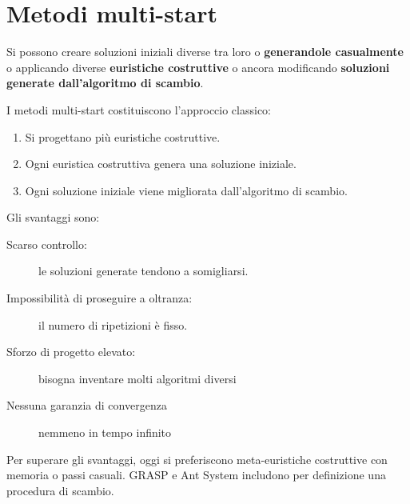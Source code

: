 \documentclass[\main/main.tex]{subfiles}
\begin{document}
\section{Metodi multi-start}
\begin{multicols}{2}
    \begin{observation}
        Si possono creare soluzioni iniziali diverse tra loro o \textbf{generandole casualmente} o applicando diverse \textbf{euristiche costruttive} o ancora modificando \textbf{soluzioni generate dall'algoritmo di scambio}.
    \end{observation}
    \begin{definition}
        I metodi multi-start costituiscono l'approccio classico:
        \begin{enumerate}
            \item Si progettano più euristiche costruttive.
            \item Ogni euristica costruttiva genera una soluzione iniziale.
            \item Ogni soluzione iniziale viene migliorata dall'algoritmo di scambio.
        \end{enumerate}
    \end{definition}
    \begin{observation}
        Gli svantaggi sono:
        \begin{description}
            \item[Scarso controllo:] le soluzioni generate tendono a somigliarsi.
            \item[Impossibilità di proseguire a oltranza:] il numero di ripetizioni è fisso.
            \item[Sforzo di progetto elevato:] bisogna inventare molti algoritmi diversi
            \item[Nessuna garanzia di convergenza] nemmeno in tempo infinito
        \end{description}
    \end{observation}
    \begin{observation}
        Per superare gli svantaggi, oggi si preferiscono meta-euristiche costruttive con memoria o passi casuali. GRASP e Ant System includono per definizione una procedura di scambio.
    \end{observation}
    \begin{observation}

\end{observation}
\end{multicols}
\end{document}
